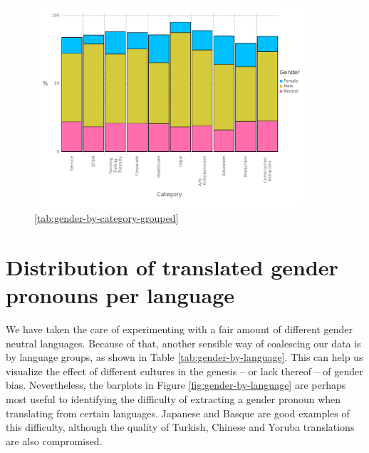 \documentclass[fleqn,10pt]{article}
\begin{document}
\begin{figure}[H]
	\centering
	\includegraphics[width=10cm]{pictures/barplot-gender-by-category-grouped}
	\caption{ \ref{tab:gender-by-category-grouped}}
	\label{fig:gender-by-category}
\end{figure}

\section{Distribution of translated gender pronouns per language}

We have taken the care of experimenting with a fair amount of different gender neutral languages. Because of that, another sensible way of coalescing our data is by language groups, as shown in Table \ref{tab:gender-by-language}. This can help us visualize the effect of different cultures in the genesis -- or lack thereof -- of gender bias. Nevertheless, the barplots in Figure \ref{fig:gender-by-language} are perhaps most useful to identifying the difficulty of extracting a gender pronoun when translating from certain languages. Japanese and Basque are good examples of this difficulty, although the quality of Turkish, Chinese and Yoruba translations are also compromised.
\end{document}
